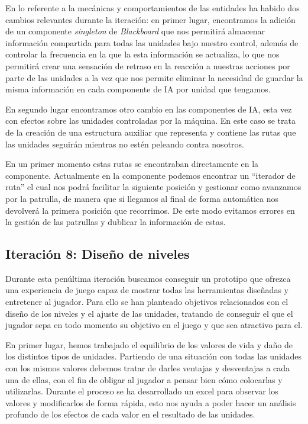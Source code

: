 En lo referente a la mecánicas y comportamientos de las entidades ha habido dos cambios relevantes durante
la iteración: en primer lugar, encontramos la adición de un componente \textit{singleton} de \textit{Blackboard}
que nos permitirá almacenar información compartida para todas las unidades bajo nuestro control, además de
controlar la frecuencia en la que la esta información se actualiza, lo que nos permitirá crear una sensación
de retraso en la reacción a nuestras acciones por parte de las unidades a la vez que nos permite eliminar
la necesidad de guardar la misma información en cada componente de \ac{IA} por unidad que tengamos.

En segundo lugar encontramos otro cambio en las componentes de \ac{IA}, esta vez con efectos sobre las unidades
controladas por la máquina. En este caso se trata de la creación de una estructura auxiliar que representa 
y contiene las rutas que las unidades seguirán mientras no estén peleando contra nosotros.

En un primer momento estas rutas se encontraban directamente en la componente. Actualmente en la componente 
podemos
encontrar un ``iterador de ruta'' el cual nos podrá facilitar la siguiente posición y gestionar como avanzamos
por la patrulla, de manera que si llegamos al final de forma automática nos devolverá la primera posición
que recorrimos. De este modo evitamos errores en la gestión de las patrullas y dublicar la información de estas.
 

\subsection*{Iteración 8: Diseño de niveles}
Durante esta penúltima iteración buscamos conseguir un prototipo que ofrezca una experiencia
de juego capaz de mostrar todas las herramientas diseñadas y entretener al jugador. Para ello se han 
planteado objetivos relacionados con el diseño de los niveles y el ajuste de las unidades, tratando
de conseguir el que el jugador sepa en todo momento su objetivo en el juego y que sea atractivo para el.

En primer lugar, hemos trabajado el equilibrio de los valores de vida y daño de los distintos tipos de
unidades. Partiendo de una situación con todas las unidades con los mismos valores
debemos tratar de darles ventajas y desventajas a cada una de ellas, con el fin de obligar al
jugador a pensar bien cómo colocarlas y utilizarlas. Durante el proceso se ha desarrollado un excel
para observar los valores y modificarlos de forma rápida, esto nos ayuda a poder hacer un análisis
profundo de los efectos de cada valor en el resultado de las unidades.

